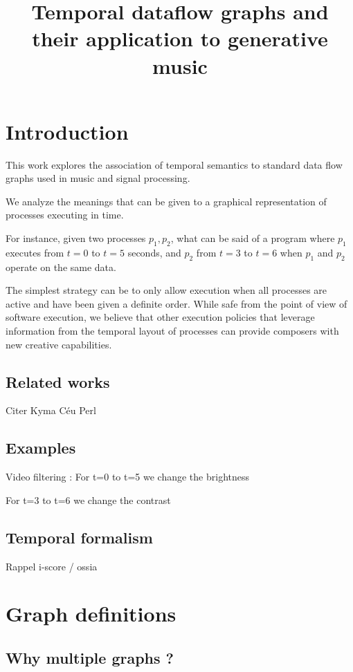 \documentclass[a4paper,twocolumns]{article}
\title{Temporal dataflow graphs and their application to generative music}
\begin{document}
	\maketitle
	
	\section{Introduction}
    This work explores the association of temporal semantics to standard data flow graphs used in music and signal processing.
    
    We analyze the meanings that can be given to a graphical representation of processes executing in time. 
    
    For instance, given two processes $p_1, p_2$, what can be said of a program where $p_1$ executes from $t=0$ to $t=5$ seconds, and $p_2$ from $t=3$ to $t=6$ when $p_1$ and $p_2$ operate on the same data.
    
    The simplest strategy can be to only allow execution when all processes are active and have been given a definite order. 
    While safe from the point of view of software execution, we believe that other execution policies that leverage information from the temporal layout of processes can provide composers with new creative capabilities.
    
    
    \subsection{Related works}
    Citer Kyma
    Céu
    Perl
    
    \subsection{Examples}
    Video filtering : 
    For t=0 to t=5 we change the brightness
    
    For t=3 to t=6 we change the contrast
    
    \subsection{Temporal formalism}
    Rappel i-score / ossia
    
    
    
	\section{Graph definitions}
	\subsection{Why multiple graphs ?}
\end{document}

